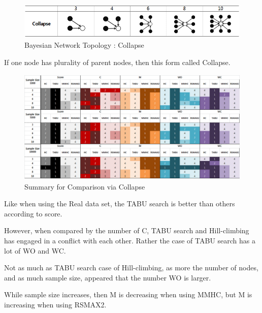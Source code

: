 	\begin{figure}[!bhp]
	\centering
		\includegraphics[height=50pt]{Topologies_Collapse}
		\caption{Bayesian Network Topology : Collapse}
	\end{figure}	

	If one node has plurality of parent nodes, then this form called Collapse.

	\begin{figure}[!bhp]
	\centering
		\includegraphics[height=155pt]{Result_Collapse}
		\caption{Summary for Comparison via Collapse}
	\end{figure}	

Like when using the Real data set, the TABU search is better than others according to score.

However, when compared by the number of C, TABU search and Hill-climbing has engaged in a conflict with each other. Rather the case of TABU search has a lot of WO and WC.

Not as much as TABU search case of Hill-climbing, as more the number of nodes, and as much sample size, appeared that the number WO is larger.

While sample size increases, then M is decreasing when using MMHC, but M is increasing when using RSMAX2.
	
